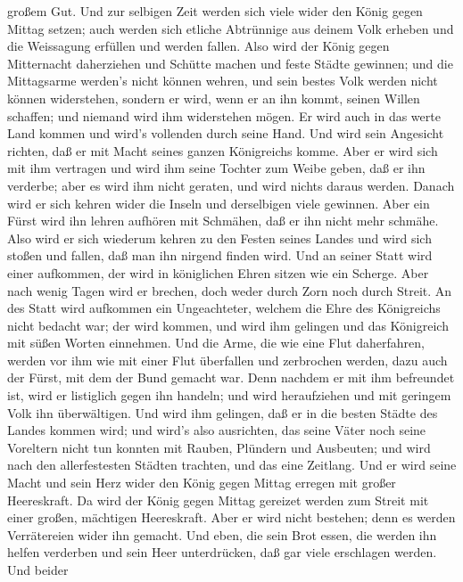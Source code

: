 großem Gut.  Und zur selbigen Zeit werden sich viele wider
den König gegen Mittag setzen; auch werden sich etliche Abtrünnige aus
deinem Volk erheben und die Weissagung erfüllen und werden fallen.
 Also wird der König gegen Mitternacht daherziehen und
Schütte machen und feste Städte gewinnen; und die Mittagsarme werden's
nicht können wehren, und sein bestes Volk werden nicht können
widerstehen,  sondern er wird, wenn er an ihn kommt, seinen
Willen schaffen; und niemand wird ihm widerstehen mögen. Er wird auch in
das werte Land kommen und wird's vollenden durch seine Hand.
 Und wird sein Angesicht richten, daß er mit Macht seines
ganzen Königreichs komme. Aber er wird sich mit ihm vertragen und wird
ihm seine Tochter zum Weibe geben, daß er ihn verderbe; aber es wird ihm
nicht geraten, und wird nichts daraus werden.  Danach wird
er sich kehren wider die Inseln und derselbigen viele gewinnen. Aber ein
Fürst wird ihn lehren aufhören mit Schmähen, daß er ihn nicht mehr
schmähe.  Also wird er sich wiederum kehren zu den Festen
seines Landes und wird sich stoßen und fallen, daß man ihn nirgend
finden wird.  Und an seiner Statt wird einer aufkommen, der
wird in königlichen Ehren sitzen wie ein Scherge. Aber nach wenig Tagen
wird er brechen, doch weder durch Zorn noch durch Streit. 
An des Statt wird aufkommen ein Ungeachteter, welchem die Ehre des
Königreichs nicht bedacht war; der wird kommen, und wird ihm gelingen
und das Königreich mit süßen Worten einnehmen.  Und die
Arme, die wie eine Flut daherfahren, werden vor ihm wie mit einer Flut
überfallen und zerbrochen werden, dazu auch der Fürst, mit dem der Bund
gemacht war.  Denn nachdem er mit ihm befreundet ist, wird
er listiglich gegen ihn handeln; und wird heraufziehen und mit geringem
Volk ihn überwältigen.  Und wird ihm gelingen, daß er in
die besten Städte des Landes kommen wird; und wird's also ausrichten,
das seine Väter noch seine Voreltern nicht tun konnten mit Rauben,
Plündern und Ausbeuten; und wird nach den allerfestesten Städten
trachten, und das eine Zeitlang.  Und er wird seine Macht
und sein Herz wider den König gegen Mittag erregen mit großer
Heereskraft. Da wird der König gegen Mittag gereizet werden zum Streit
mit einer großen, mächtigen Heereskraft. Aber er wird nicht bestehen;
denn es werden Verrätereien wider ihn gemacht.  Und eben,
die sein Brot essen, die werden ihn helfen verderben und sein Heer
unterdrücken, daß gar viele erschlagen werden.  Und beider

